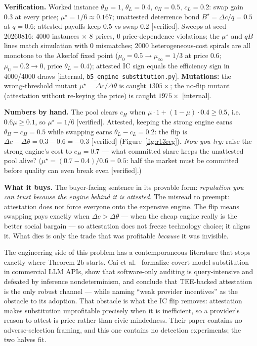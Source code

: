 \documentclass[11pt,a4paper]{article}
\begin{document}
\begin{thebox}
\textbf{Verification.} Worked instance $\theta_H{=}1$, $\theta_L{=}0.4$, $c_H{=}0.5$, $c_L{=}0.2$: swap gain $0.3$ at every price;
$\mu^\star=1/6\approx 0.167$; unattested deterrence bond $B^\star=\Delta c/q=0.5$ at $q=0.6$; attested payoffs keep $0.5$ vs swap
$0.2$ [verified]. Sweeps at seed 20260816: 4000 instances $\times$ 8 prices, 0 price-dependence violations; the $\mu^\star$ and
$qB$ lines match simulation with 0 mismatches; 2000 heterogeneous-cost spirals are all monotone to the Akerlof fixed point
($\mu_0{=}0.5\to\mu_\infty{=}1/3$ at price $0.6$; $\mu_0{=}0.2\to 0$, price $\theta_L{=}0.4$); attested IC sign equals the
efficiency sign in 4000/4000 draws [internal, \texttt{b5\_engine\_substitution.py}]. \textbf{Mutations:} the wrong-threshold
mutant $\mu^\star=\Delta c/\Delta\theta$ is caught $1305\times$; the no-flip mutant (attestation without re-keying the price) is
caught $1975\times$ [internal].
\end{thebox}

\textbf{Numbers by hand.} The pool clears $c_H$ when $\mu\cdot 1+(1-\mu)\cdot 0.4\ge 0.5$, i.e.\ $0.6\mu\ge 0.1$, so
$\mu^\star=1/6$ [verified]. Attested, keeping the strong engine earns $\theta_H-c_H=0.5$ while swapping earns
$\theta_L-c_L=0.2$: the flip is $\Delta c-\Delta\theta=0.3-0.6=-0.3$ [verified] (Figure~\ref{fig:r13reg}). \emph{Now you try:} raise the strong engine's cost
to $c_H=0.7$ --- what committed share keeps the unattested pool alive? ($\mu^\star=(0.7-0.4)/0.6=0.5$: half the market must be
committed before quality can even break even [verified].)



\textbf{What it buys.} The buyer-facing sentence in its provable form: \emph{reputation you can trust because the engine behind it
is attested}. The misread to preempt: attestation does not force everyone onto the expensive engine. The flip means swapping pays
exactly when $\Delta c>\Delta\theta$ --- when the cheap engine really is the better social bargain --- so attestation does not
freeze technology choice; it aligns it. What dies is only the trade that was profitable \emph{because} it was invisible.

The engineering side of this problem has a contemporaneous literature that stops exactly where Theorem 2b starts. Cai et al.\
\cite{cai2025} formalize covert model substitution in commercial LLM APIs, show that software-only auditing is query-intensive
and defeated by inference nondeterminism, and conclude that TEE-backed attestation is the only robust channel --- while naming
``weak provider incentives'' as the obstacle to its adoption. That obstacle is what the IC flip removes: attestation makes
substitution unprofitable precisely when it is inefficient, so a provider's reason to attest is price rather than
civic-mindedness. Their paper contains no adverse-selection framing, and this one contains no detection experiments; the two
halves fit.
\end{document}
